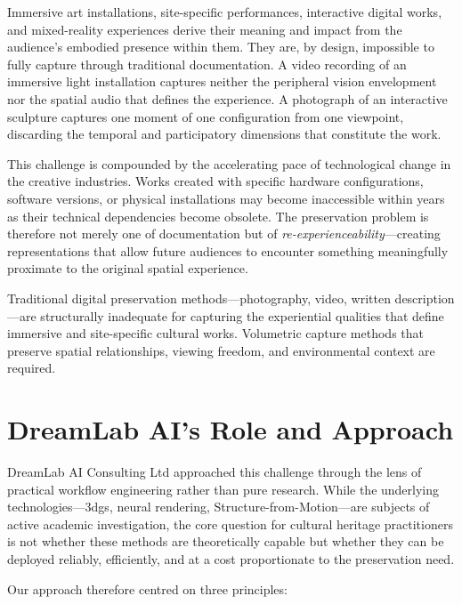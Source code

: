Immersive art installations, site-specific performances, interactive digital works, and mixed-reality experiences derive their meaning and impact from the audience's embodied presence within them. They are, by design, impossible to fully capture through traditional documentation. A video recording of an immersive light installation captures neither the peripheral vision envelopment nor the spatial audio that defines the experience. A photograph of an interactive sculpture captures one moment of one configuration from one viewpoint, discarding the temporal and participatory dimensions that constitute the work.

This challenge is compounded by the accelerating pace of technological change in the creative industries. Works created with specific hardware configurations, software versions, or physical installations may become inaccessible within years as their technical dependencies become obsolete. The preservation problem is therefore not merely one of documentation but of \emph{re-experienceability}---creating representations that allow future audiences to encounter something meaningfully proximate to the original spatial experience.

\begin{keyfinding}
Traditional digital preservation methods---photography, video, written description---are structurally inadequate for capturing the experiential qualities that define immersive and site-specific cultural works. Volumetric capture methods that preserve spatial relationships, viewing freedom, and environmental context are required.
\end{keyfinding}

\section{DreamLab AI's Role and Approach}
\label{sec:intro-approach}

DreamLab AI Consulting Ltd approached this challenge through the lens of practical workflow engineering rather than pure research. While the underlying technologies---\acrlong{3dgs}, neural rendering, Structure-from-Motion---are subjects of active academic investigation, the core question for cultural heritage practitioners is not whether these methods are theoretically capable but whether they can be deployed reliably, efficiently, and at a cost proportionate to the preservation need.

Our approach therefore centred on three principles:

